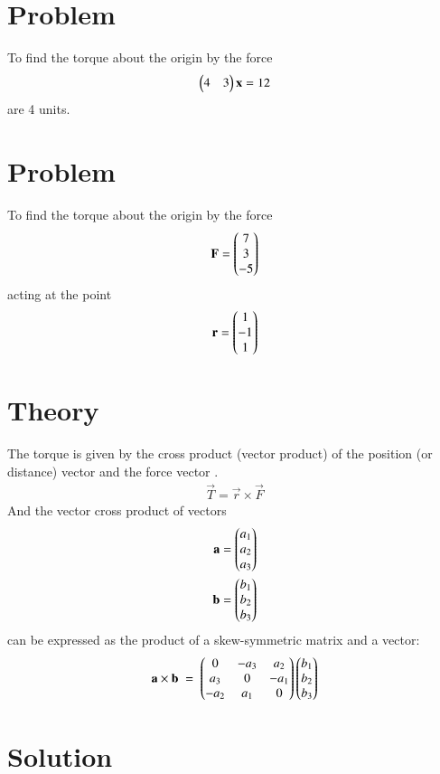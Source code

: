 \documentclass[journal,12pt,twocolumn]{IEEEtran}
\begin{document}
\section{Problem}
To find the torque about the origin by the force 
\begin{align}
\begin{pmatrix}4 & 3\end{pmatrix} \mathbf{x} = 12
\end{align}
are 4 units.

\section{Problem}
To find the torque about the origin by the force
\begin{align}
\mathbf{F} = \begin{pmatrix}  7 \\  3 \\ -5\end{pmatrix}
\end{align}
acting at the point 
\begin{align}
\mathbf{r} = \begin{pmatrix}  1 \\  -1 \\ 1\end{pmatrix}
\end{align}

\section{Theory}
The torque  is given by the cross product (vector product) of the position (or distance) vector   and the force vector .
\begin{align}
    \vec{T} = {\vec{r}  \times  \vec{F}}
\end{align}
And the vector cross product of vectors 
\begin{align}
\mathbf{a} = \begin{pmatrix}  a_1 \\  a_2 \\ a_3\end{pmatrix}
\\
\mathbf{b} = \begin{pmatrix}  b_1 \\  b_2  \\ b_3\end{pmatrix}
\end{align}
can be expressed as the product of a skew-symmetric matrix and a vector:
\begin{align}
\mathbf{a \times b} \;=\; \begin{pmatrix}0 & -a_3 & a_2\\ a_3& 0 &-a_1 \\ -a_2 & a_1 & 0 \end{pmatrix} \begin{pmatrix}b_1\\b_2\\b_3\end{pmatrix}    
\end{align}
\section{Solution}
\end{document}

